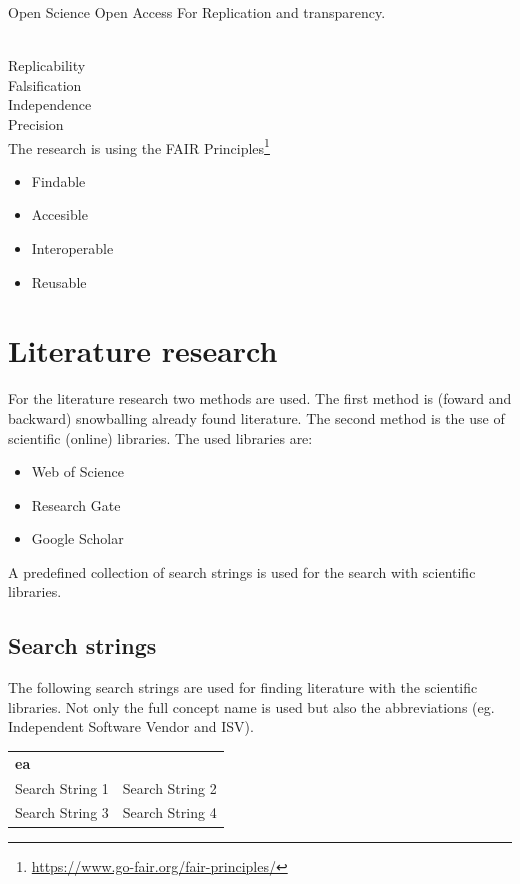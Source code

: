 Open Science
Open Access
For Replication and transparency.


\parencite[p. 16]{Recker2013}\\
Replicability\\
Falsification\\
Independence\\
Precision\\

The research is using the FAIR Principles\footnote{\url{https://www.go-fair.org/fair-principles/}}\\
\begin{itemize}
	\item{Findable}
	\item{Accesible}
	\item{Interoperable}
	\item{Reusable}
\end{itemize}

\section{Literature research}
For the literature research two methods are used. The first method is (foward and backward) snowballing already found literature. The second method is the use of scientific (online) libraries. The used libraries are:
\begin{itemize}
	\item{Web of Science}
	\item{Research Gate}
	\item{Google Scholar}
\end{itemize}

\noindent A predefined collection of search strings is used for the search with scientific libraries.

\subsection{Search strings}
The following search strings are used for finding literature with the scientific libraries. Not only the full concept name is used but also the abbreviations (eg. Independent Software Vendor and ISV).\\

	\noindent
	\begin{tabular}{p{}p{}}
		\textbf{\acrlong{ea}} & \\
		Search String 1	&	Search String 2\\%
		Search String 3	&	Search String 4\\%
	\end{tabular}

